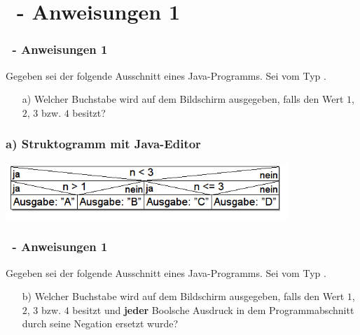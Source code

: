 \def\stitle{\theexercise\ - Anweisungen 1}
\section{\stitle}
\begin{frame}[t]%
    \frametitle{\stitle}

Gegeben sei der folgende Ausschnitt eines Java-Programms. Sei  vom Typ .



\begin{itemize}
\item[a)] Welcher Buchstabe wird auf dem Bildschirm ausgegeben, falls  den Wert $1$, $2$, $3$ bzw. $4$ besitzt?
\end{itemize}
\end{frame}


\begin{frame}[fragile]%
 \frametitle{a) Struktogramm mit Java-Editor}%

\begin{center}

\includegraphics[width=0.8\textwidth]{anweis-1/Bilder/Struktogramm_a}
\end{center}

\end{frame}

\begin{frame}[t]%
    \frametitle{\stitle}

Gegeben sei der folgende Ausschnitt eines Java-Programms. Sei  vom Typ .



\begin{itemize}
\item[b)] Welcher Buchstabe wird auf dem Bildschirm ausgegeben, falls  den Wert $1$, $2$, $3$ bzw. $4$ besitzt und \textbf{jeder} Boolsche Ausdruck in dem Programmabschnitt durch seine Negation ersetzt wurde?
\end{itemize}
\end{frame}

